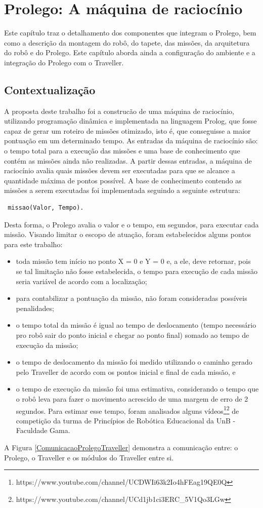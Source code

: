 \chapter{Prolego: A máquina de raciocínio}

Este capítulo traz o detalhamento dos componentes que integram o Prolego, bem como a descrição da montagem do robô, do tapete, das missões, da arquitetura do robô e do Prolego. Este capítulo aborda ainda a configuração do ambiente e a integração do Prolego com o Traveller.

\section{Contextualização}

A proposta deste trabalho foi a construcão de uma máquina de raciocínio, utilizando programação dinâmica e implementada na linguagem Prolog, que fosse capaz de gerar um roteiro de missões otimizado, isto é, que conseguisse a maior pontuação em um determinado tempo. As entradas da máquina de raciocínio são: o tempo total para a execução das missões e uma base de conhecimento que contém as missões ainda não realizadas.
A partir dessas entradas, a máquina de raciocínio avalia quais missões devem ser executadas para que se alcance a quantidade máxima de pontos possível. A base de conhecimento contendo as missões a serem executadas foi implementada seguindo a seguinte estrutura:
 \begin{lstlisting} 
 missao(Valor, Tempo).
 \end{lstlisting}
 Desta forma, o Prolego avalia o valor e o tempo, em segundos, para executar cada missão. Visando limitar o escopo de atuação, foram estabelecidos alguns pontos para este trabalho:
 \begin{itemize}
 \item toda missão tem início no ponto X = 0 e Y = 0 e, a ele, deve retornar, pois se tal limitação não fosse estabelecida, o tempo para execução de cada missão seria variável de acordo com a localização;
 \item para contabilizar a pontuação da missão, não foram consideradas possíveis penalidades;
 \item o tempo total da missão é igual ao tempo de deslocamento (tempo necessário pro robô sair do ponto inicial e chegar ao ponto final) somado ao tempo de execução da missão;
 \item o tempo de deslocamento da missão foi medido utilizando o caminho gerado pelo Traveller de acordo com os pontos inicial e final de cada missão, e
 \item o tempo de execução da missão foi uma estimativa, considerando o tempo que o robô leva para fazer o movimento acrescido de uma margem de erro de 2 segundos. Para estimar esse tempo, foram analisados alguns vídeos\footnote{https://www.youtube.com/channel/UCDWIi63k2Io4hFEag19QE0Q}\footnote{https://www.youtube.com/channel/UCd1jb1c\-i3ERC\_5V1Qo3LGw} de competição da turma de Princípios de Robótica Educacional da UnB - Faculdade Gama. 
 \end{itemize}
 A Figura \ref{ComunicacaoProlegoTraveller} demonstra a comunicação entre: o Prolego, o Traveller e os módulos do Traveller entre si.

